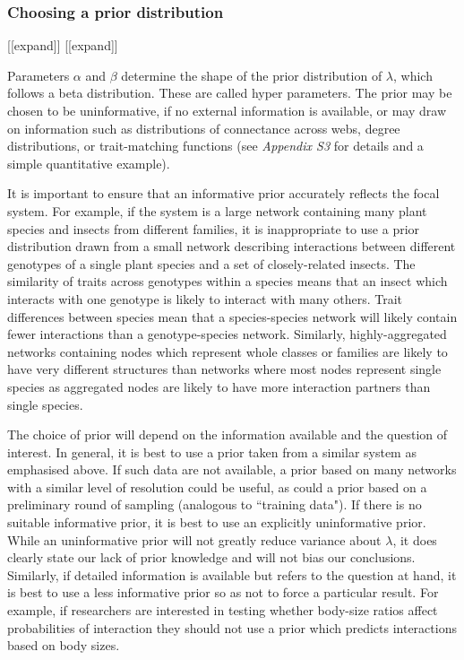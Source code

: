 \documentclass[12pt]{article}
\begin{document}
\begin{spacing}{2.0}
    \subsubsection*{Choosing a prior distribution}  [[expand]]
      [[expand]]

      Parameters $\alpha$ and $\beta$ determine the shape of the prior distribution of $\lambda$, which follows a beta distribution. These are called hyper parameters. The prior may be chosen to be uninformative, if no external information is available, or may draw on information such as distributions of connectance across webs, degree distributions, or trait-matching functions (see \emph{Appendix S3} for details and a simple quantitative example). 


      It is important to ensure that an informative prior accurately reflects the focal  system. For example, if the system is a large network containing many plant species and insects from different families, it is inappropriate to use a prior distribution drawn from a small network describing interactions between different genotypes of a single plant species and a set of closely-related insects. The similarity of traits across genotypes within a species means that an insect which interacts with one genotype is likely to interact with many others. Trait differences between species mean that a species-species network will likely contain fewer interactions than a genotype-species network. Similarly, highly-aggregated networks containing nodes which represent whole classes or families are likely to have very different structures than networks where most nodes represent single species as aggregated nodes are likely to have more interaction partners than single species.


      The choice of prior will depend on the information available and the question of interest. In general, it is best to use a prior taken from a similar system as emphasised above. If such data are not available, a prior based on many networks with a similar level of resolution could be useful, as could a prior based on a preliminary round of sampling (analogous to ``training data"). If there is no suitable informative prior, it is best to use an explicitly uninformative prior. While an uninformative prior will not greatly reduce variance about $\lambda$, it does clearly state our lack of prior knowledge and will not bias our conclusions. Similarly, if detailed information is available but refers to the question at hand, it is best to use a less informative prior so as not to force a particular result. For example, if researchers are interested in testing whether body-size ratios affect probabilities of interaction they should not use a prior which predicts interactions based on body sizes.


\end{spacing}
\end{document}
